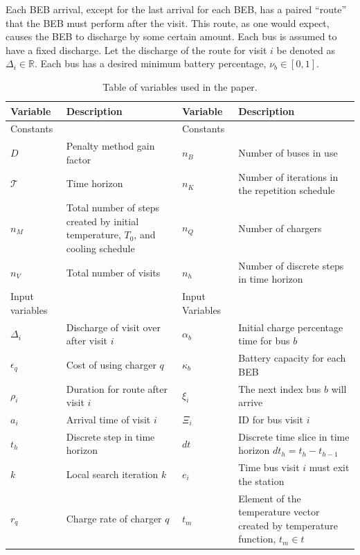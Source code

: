 \documentclass[energies,article,submit,moreauthors]{Definitions/mdpi}
\newcommand{\T}{\mathcal{T}}                %
\newcommand{\Tau}{T}                        %
\begin{document}
Each BEB arrival, except for the last arrival for each BEB, has a paired ``route'' that the BEB must perform after the
visit. This route, as one would expect, causes the BEB to discharge by some certain amount. Each bus is assumed to have
a fixed discharge. Let the discharge of the route for visit \(i\) be denoted as \(\Delta_i \in \mathbb{R}\). Each bus has a desired minimum
battery percentage, \(\nu_b \in [0, 1]\).

\begin{table}[htbp]
\caption{\label{tab:variables}Table of variables used in the paper.}
\centering
\begin{tabularx}{\textwidth}{L{0.3} L{1.2} L{0.3} L{1.2}}
\textbf{Variable} & \textbf{Description} & \textbf{Variable} & \textbf{Description}\\[0pt]
\hline
Constants &  & Constants & \\[0pt]
\(D\) & Penalty method gain factor & \(n_B\) & Number of buses in use\\[0pt]
\(\T\) & Time horizon & \(n_K\) & Number of iterations in the repetition schedule\\[0pt]
\(n_M\) & Total number of steps created by initial temperature, \(\Tau_0\), and cooling schedule & \(n_Q\) & Number of chargers\\[0pt]
\(n_V\) & Total number of visits & \(n_h\) & Number of discrete steps in time horizon\\[0pt]
\hline
Input variables &  & Input Variables & \\[0pt]
\(\Delta_i\) & Discharge of visit over after visit \(i\) & \(\alpha_b\) & Initial charge percentage time for bus \(b\)\\[0pt]
\(\epsilon_q\) & Cost of using charger \(q\) & \(\kappa_b\) & Battery capacity for each BEB\\[0pt]
\(\rho_i\) & Duration for route after visit \(i\) & \(\xi_i\) & The next index bus \(b\) will arrive\\[0pt]
\(a_i\) & Arrival time of visit \(i\) & \(\Xi_i\) & ID for bus visit \(i\)\\[0pt]
\(t_h\) & Discrete step in time horizon & \(dt\) & Discrete time slice in time horizon \(dt_h = t_h - t_{h-1}\)\\[0pt]
\(k\) & Local search iteration \(k\) & \(e_i\) & Time bus visit \(i\) must exit the station\\[0pt]
\(r_q\) & Charge rate of charger \(q\) & \(t_m\) & Element of the temperature vector created by temperature function, \(t_m \in t\)\\[0pt]

\end{tabularx}
\end{table}
\end{document}

